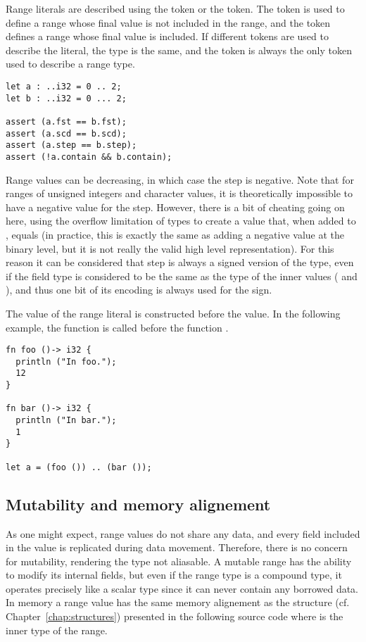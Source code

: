 Range literals are described using the  token or the 
token. The  token is used to define a range whose final value is not
included in the range, and the  token defines a range whose final
value is included. If different tokens are used to describe the literal, the
type is the same, and the  token is always the only token used to
describe a range type.

\begin{lstlisting}[style=coloredverbatim]
let a : ..i32 = 0 .. 2;
let b : ..i32 = 0 ... 2;

assert (a.fst == b.fst);
assert (a.scd == b.scd);
assert (a.step == b.step);
assert (!a.contain && b.contain);
\end{lstlisting}

Range values can be decreasing, in which case the step is negative. Note that
for ranges of unsigned integers and character values, it is theoretically
impossible to have a negative value for the step. However, there is a bit of
cheating going on here, using the overflow limitation of types to create a value
that, when added to , equals  (in practice,
this is exactly the same as adding a negative value at the binary level, but it
is not really the valid high level representation). For this reason it can be
considered that step is always a signed version of the type, even if the field
type is considered to be the same as the type of the inner values (
and ), and thus one bit of its encoding is always used for the sign.
\smallskip

The  value of the range literal is constructed before the
 value. In the following example, the function  is
called before the function .

\begin{lstlisting}[style=coloredverbatim]
fn foo ()-> i32 {
  println ("In foo.");
  12
}

fn bar ()-> i32 {
  println ("In bar.");
  1
}

let a = (foo ()) .. (bar ());
\end{lstlisting}

\subsection {Mutability and memory alignement}

As one might expect, range values do not share any data, and every field
included in the value is replicated during data movement. Therefore, there is no
concern for mutability, rendering the type not aliasable. A mutable range has
the ability to modify its internal fields, but even if the range type is a
compound type, it operates precisely like a scalar type since it can never
contain any borrowed data. In memory a range value has the same memory
alignement as the structure (cf. Chapter~\ref{chap:structures}) presented in the
following source code where  is the inner type of the range.

